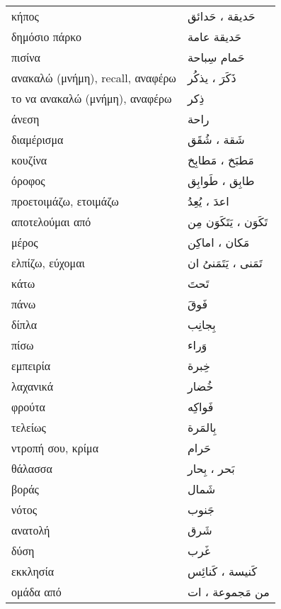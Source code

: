 \documentclass[twocolumn,a4paper]{article}
\newcommand{\ar}[1]{\textarabic{#1}}
\newcommand{\pl}{\raisebox{0.15ex}{\footnotesize ◍}}
\newcommand{\normpl}[1]{\ar{ #1، ات }}
\newcommand{\vrf}{\raisebox{0.15ex}{\footnotesize ◉}}
\newcommand{\mas}{\raisebox{0.15ex}{\footnotesize ◫}}
\begin{document}
\begin{mpsupertabular}{ P{0.5\textwidth} P{0.5\textwidth} }
κήπος \pl                    & \ar{ حَديقة ، حَدائق } \\
δημόσιο πάρκο                & \ar{ حَديقة عامة } \\
πισίνα                       & \ar{ حَمام سِباحة } \\
ανακαλώ (μνήμη), recall, αναφέρω \vrf  & \ar{ ذَكَرَ ، يذكُر } \\
το να ανακαλώ (μνήμη), αναφέρω \mas    & \ar{ ذِكر } \\
άνεση                        & \ar{ راحة } \\
διαμέρισμα \pl               & \ar{ شَقة ، شُقَق} \\
κουζίνα \pl                  & \ar{ مَطبَخ ، مَطابِخ } \\
όροφος \pl                   & \ar{ طابِق ، طَوابِق } \\
προετοιμάζω, ετοιμάζω \vrf   & \ar{ اعدَ ، يُعِدُ } \\
αποτελούμαι από \vrf         & \ar{ تَكَوَن ، يَتَكَوَن مِن } \\
μέρος \pl                    & \ar{ مَكان ، اماكِن } \\
ελπίζω, εύχομαι \vrf         & \ar{ تَمَنى ، يَتَمَنىُ ان } \\
κάτω                         & \ar{ تَحتَ } \\
πάνω                         & \ar{ فَوقَ } \\
δίπλα                        & \ar{ بِجانِب } \\
πίσω                         & \ar{ وَراء } \\
εμπειρία                     & \ar{ خِبرة } \\
λαχανικά                     & \ar{ خُضار } \\
φρούτα                       & \ar{ فَواكِه } \\
τελείως                      & \ar{ بِالمَرة } \\
ντροπή σου, κρίμα            & \ar{ حَرام } \\
θάλασσα \pl                  & \ar{ بَحر ، بِحار } \\
βοράς                        & \ar{ شَمال } \\
νότος                        & \ar{ جَنوب } \\
ανατολή                      & \ar{ شَرق } \\
δύση                         & \ar{ غَرب } \\
εκκλησία \pl                 & \ar{ كَنيسة ، كَنائِس } \\
ομάδα από \pl                & \ar{من} \normpl{ مَجموعة } \\

\end{mpsupertabular}
\end{document}
